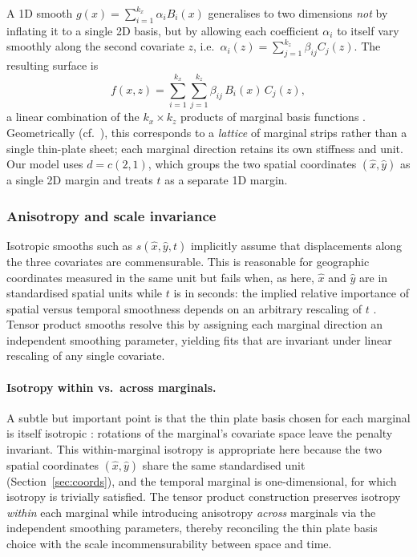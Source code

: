 \documentclass[12pt, a4paper]{article}
\begin{document}
A 1D smooth $g(x) = \sum_{i=1}^{k_x} \alpha_i B_i(x)$ generalises to two
dimensions \emph{not} by inflating it to a single 2D basis, but by allowing
each coefficient $\alpha_i$ to itself vary smoothly along the second
covariate $z$, i.e.\ $\alpha_i(z) = \sum_{j=1}^{k_z} \beta_{ij} C_j(z)$.
The resulting surface is
%
\begin{equation}\label{eq:tensor_basis}
  f(x, z) = \sum_{i=1}^{k_x}\sum_{j=1}^{k_z}
            \beta_{ij}\, B_i(x)\, C_j(z),
\end{equation}
%
a linear combination of the $k_x \times k_z$ products of marginal basis
functions \citep[\S 5.6.1]{Wood2017}.
Geometrically (cf.\ \citet[Fig.~5.17]{Wood2017}), this corresponds to a
\emph{lattice} of marginal strips rather than a single thin-plate sheet;
each marginal direction retains its own stiffness and unit.
Our model uses $d = c(2, 1)$, which groups the two spatial coordinates
$(\hat{x}, \hat{y})$ as a single 2D margin and treats $t$ as a separate 1D
margin.

\subsubsection{Anisotropy and scale invariance}\label{sec:theory_aniso}

Isotropic smooths such as $s(\hat{x}, \hat{y}, t)$ implicitly assume that
displacements along the three covariates are commensurable.
This is reasonable for geographic coordinates measured in the same unit but
fails when, as here, $\hat{x}$ and $\hat{y}$ are in standardised spatial
units while $t$ is in seconds: the implied relative importance of spatial
versus temporal smoothness depends on an arbitrary rescaling of $t$
\citep[\S 5.7]{Wood2017}.
Tensor product smooths resolve this by assigning each marginal direction
an independent smoothing parameter, yielding fits that are invariant under
linear rescaling of any single covariate.

\paragraph{Isotropy within vs.\ across marginals.}
A subtle but important point is that the thin plate basis chosen for each
marginal is itself isotropic \citep[\S 5.7]{Wood2017}: rotations of the
marginal's covariate space leave the penalty invariant. This
within-marginal isotropy is appropriate here because the two spatial
coordinates $(\hat{x}, \hat{y})$ share the same standardised unit
(Section~\ref{sec:coords}), and the temporal marginal is one-dimensional,
for which isotropy is trivially satisfied. The tensor product construction
preserves isotropy \emph{within} each marginal while introducing
anisotropy \emph{across} marginals via the independent smoothing
parameters, thereby reconciling the thin plate basis choice with the
scale incommensurability between space and time.
\end{document}
